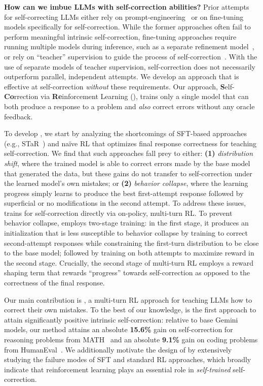 \textbf{How can we imbue LLMs with self-correction abilities?} Prior attempts for self-correcting LLMs either rely on prompt-engineering~\citep{madaan2023self, kim2023language} or on fine-tuning models specifically for self-correction. While the former approaches often fail to perform meaningful intrinsic self-correction, fine-tuning approaches require running multiple models during inference, such as a separate refinement model~\citep{havrilla2024glore,welleck2023generating}, or rely on ``teacher'' supervision to guide the process of self-correction~\citep{qu2024recursive}. With the use of separate models of teacher supervision, self-correction does not necessarily outperform parallel, independent attempts. We develop an approach that is effective at self-correction \emph{without} these requirements. Our approach, \textbf{S}elf-\textbf{Co}rrection via \textbf{Re}inforcement Learning (\methodname{}), trains only a single model that can both produce a response to a problem and \emph{also} correct errors without any oracle feedback.

To develop \methodname{}, we start by analyzing the shortcomings of SFT-based approaches (e.g., STaR~\citep{zelikman2022star}) and na\"ive RL that optimizes final response correctness for teaching self-correction. We find that such approaches fall prey to either:  \textbf{(1)} \emph{distribution shift}, where the trained model is able to correct errors made by the base model that generated the data, but these gains do not transfer to self-correction under the learned model's own mistakes; or \textbf{(2)} \emph{behavior collapse}, where the learning progress simply learns to produce the best first-attempt response followed by superficial or no modifications in the second attempt. To address these issues, \methodname{} trains for self-correction directly via on-policy, multi-turn RL. To prevent behavior collapse, \methodname{} employs two-stage training: in the first stage, it produces an initialization that is less susceptible to behavior collapse  by training to correct second-attempt responses while constraining the first-turn distribution to be close to the base model; followed by training on both attempts to maximize reward in the second stage. Crucially, the second stage of multi-turn RL employs a reward shaping term that rewards ``progress'' towards self-correction as opposed to the correctness of the final response.  






Our main contribution is \methodname{}, a multi-turn RL approach for teaching LLMs how to correct their own mistakes. To the best of our knowledge, \methodname{} is the first approach to attain significantly positive intrinsic self-correction: relative to base Gemini models, our method attains an absolute \textbf{15.6\%} gain on self-correction for reasoning problems from MATH~\citep{hendrycksmath2021} and an absolute \textbf{9.1\%} gain on coding problems from HumanEval~\citep{chen2021evaluating}. We additionally motivate the design of \methodname{} by extensively studying the failure modes of SFT and standard RL approaches, which broadly indicate that reinforcement learning plays an essential role in \emph{self-trained} self-correction.
